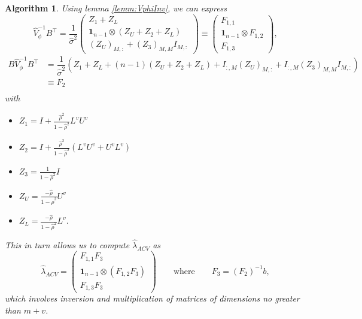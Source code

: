 \documentclass[11pt,dvipsnames]{article}
\newtheorem{algorithm}{Algorithm}
\begin{document}
\begin{appendices}
\begin{algorithm}
Using lemma \ref{lemm:VphiInv}, we can express
\begin{equation}
\widehat{V}_{\phi}^{-1}B^{\top}=\dfrac{1}{\hat{\sigma}^{2}}
\begin{pmatrix}
Z_{1}+Z_{L}\\
\mathbf{1}_{n-1} \otimes (Z_{U}+Z_{2}+Z_{L})\\
\left( Z_{U}\right)_{M,:}+\left( Z_{3}\right)_{M,M}I_{M,:}
\end{pmatrix}
\equiv
\begin{pmatrix}
F_{1,1}\\
\mathbf{1}_{n-1} \otimes F_{1,2}\\
F_{1,3}
\end{pmatrix},
\end{equation}
\begin{equation}
\begin{split}
B\widehat{V}_{\phi}^{-1}B^{\top}
&=\dfrac{1}{\hat{\sigma}^{2}}\left( Z_{1}+Z_{L}+(n-1)\left( Z_{U}+Z_{2}+Z_{L}\right) + I_{:,M}\left( Z_{U}\right)_{M,:}+I_{:,M}\left( Z_{3}\right)_{M,M}I_{M,:}\right) \\
&\equiv F_{2}\\
\end{split}
\end{equation}
with 
\begin{itemize}
\item $ Z_{1}=I+\frac{\hat{\rho}^{2}}{1-\hat{\rho}^{2}}L^{v}U^{v} $
\item $ Z_{2}=I+\frac{\hat{\rho}^{2}}{1-\hat{\rho}^{2}}\left( L^{v}U^{v}+U^{v}L^{v}\right)$
\item $ Z_{3} =\frac{1}{1-\hat{\rho}^{2}} I  $
\item $ Z_{U} =\frac{-\hat{\rho}}{1-\hat{\rho}^{2}} U^{v}  $
\item $ Z_{L} =\frac{-\hat{\rho}}{1-\hat{\rho}^{2}} L^{v}. $
\end{itemize}
This in turn allows us to compute $  \widehat{\lambda}_{ACV} $ as 
\begin{equation}
\widehat{\lambda}_{ACV} = 
\begin{pmatrix}
F_{1,1} F_{3} \\
\mathbf{1}_{n-1} \otimes \left( F_{1,2} F_{3} \right) \\
F_{1,3} F_{3}
\end{pmatrix} \qquad \text{where} \qquad F_{3} = \left( F_{2}\right) ^{-1} b,
\end{equation}
which involves inversion and multiplication of matrices of dimensions no greater than $ m+v $.
\end{algorithm}



\end{appendices}
\end{document}

